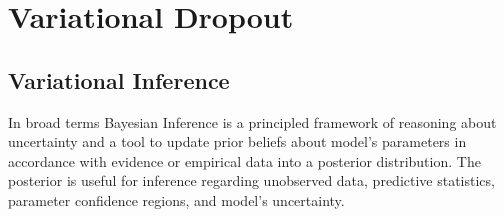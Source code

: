 \documentclass[a4paper,10pt,twocolumn]{article}
\begin{document}

\section{Variational Dropout} %
\label{sec:variational_dropout}

\subsection{Variational Inference} %
\label{sub:variational_inference}

In broad terms Bayesian Inference is a principled framework of reasoning about uncertainty
and a tool to update prior beliefs about model's parameters in accordance with evidence
or empirical data into a posterior distribution. The posterior is useful for inference
regarding unobserved data, predictive statistics, parameter confidence regions, and
model's uncertainty.
\end{document}
